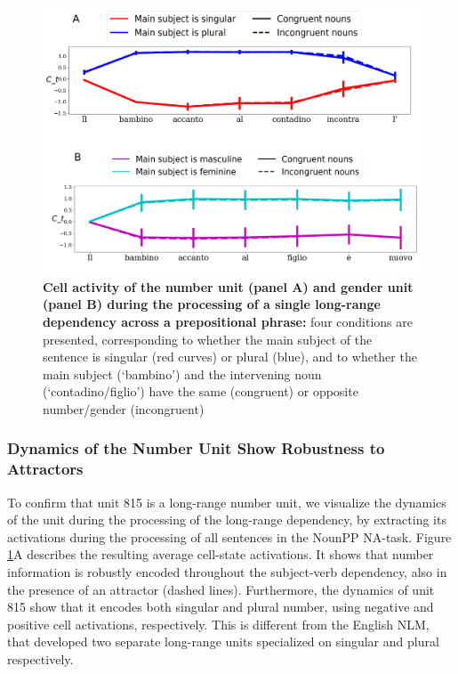 \begin{figure}[t!]
    \centering
    \includegraphics[width=\textwidth]{figures/model_activations_nounpp.png}
    \caption{\textbf{Cell activity of the number unit (panel A) and gender unit (panel B) during the processing of a single long-range dependency across a prepositional phrase:} four conditions are presented, corresponding to whether the main subject of the sentence is singular (red curves) or plural (blue), and to whether the main subject (`bambino') and the intervening noun (`contadino/figlio') have the same (congruent) or opposite number/gender (incongruent)}
    \label{fig:nounpp}
\end{figure} 

\subsubsection{Dynamics of the Number Unit Show Robustness to Attractors} 
To confirm that unit 815 is a long-range number unit, we visualize the dynamics of the unit during the processing of the long-range dependency, by extracting its activations during the processing of all sentences in the NounPP NA-task. Figure \ref{fig:nounpp}A describes the resulting average cell-state activations. It shows that number information is robustly encoded throughout the subject-verb dependency, also in the presence of an attractor (dashed lines). Furthermore, the dynamics of unit 815 show that it encodes both singular and plural number, using negative and positive cell activations, respectively. This is different from the English NLM, that developed two separate long-range units specialized on singular and plural respectively.

